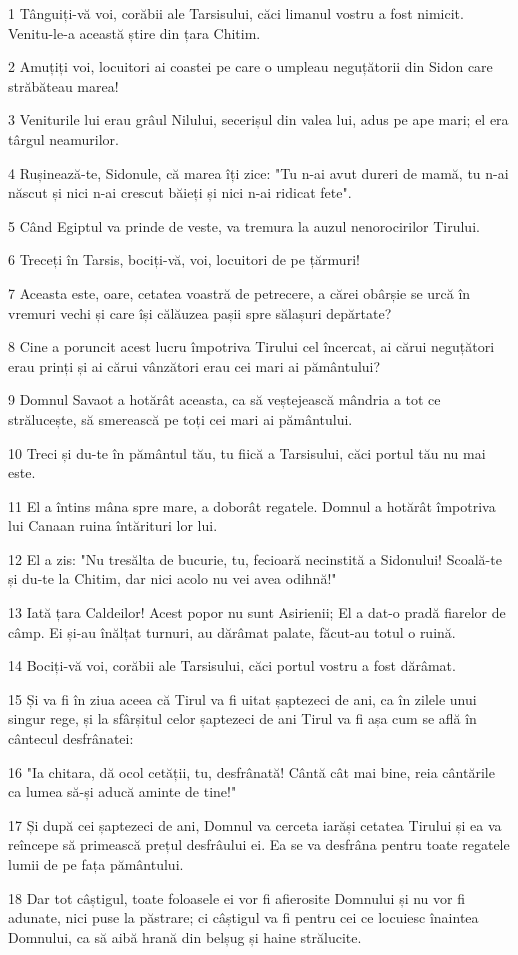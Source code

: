 \par 1 Tânguiți-vă voi, corăbii ale Tarsisului, căci limanul vostru a fost nimicit. Venitu-le-a această știre din țara Chitim.
\par 2 Amuțiți voi, locuitori ai coastei pe care o umpleau neguțătorii din Sidon care străbăteau marea!
\par 3 Veniturile lui erau grâul Nilului, secerișul din valea lui, adus pe ape mari; el era târgul neamurilor.
\par 4 Rușinează-te, Sidonule, că marea îți zice: "Tu n-ai avut dureri de mamă, tu n-ai născut și nici n-ai crescut băieți și nici n-ai ridicat fete".
\par 5 Când Egiptul va prinde de veste, va tremura la auzul nenorocirilor Tirului.
\par 6 Treceți în Tarsis, bociți-vă, voi, locuitori de pe țărmuri!
\par 7 Aceasta este, oare, cetatea voastră de petrecere, a cărei obârșie se urcă în vremuri vechi și care își călăuzea pașii spre sălașuri depărtate?
\par 8 Cine a poruncit acest lucru împotriva Tirului cel încercat, ai cărui neguțători erau prinți și ai cărui vânzători erau cei mari ai pământului?
\par 9 Domnul Savaot a hotărât aceasta, ca să veștejească mândria a tot ce strălucește, să smerească pe toți cei mari ai pământului.
\par 10 Treci și du-te în pământul tău, tu fiică a Tarsisului, căci portul tău nu mai este.
\par 11 El a întins mâna spre mare, a doborât regatele. Domnul a hotărât împotriva lui Canaan ruina întărituri lor lui.
\par 12 El a zis: "Nu tresălta de bucurie, tu, fecioară necinstită a Sidonului! Scoală-te și du-te la Chitim, dar nici acolo nu vei avea odihnă!"
\par 13 Iată țara Caldeilor! Acest popor nu sunt Asirienii; El a dat-o pradă fiarelor de câmp. Ei și-au înălțat turnuri, au dărâmat palate, făcut-au totul o ruină.
\par 14 Bociți-vă voi, corăbii ale Tarsisului, căci portul vostru a fost dărâmat.
\par 15 Și va fi în ziua aceea că Tirul va fi uitat șaptezeci de ani, ca în zilele unui singur rege, și la sfârșitul celor șaptezeci de ani Tirul va fi așa cum se află în cântecul desfrânatei:
\par 16 "Ia chitara, dă ocol cetății, tu, desfrânată! Cântă cât mai bine, reia cântările ca lumea să-și aducă aminte de tine!"
\par 17 Și după cei șaptezeci de ani, Domnul va cerceta iarăși cetatea Tirului și ea va reîncepe să primească prețul desfrâului ei. Ea se va desfrâna pentru toate regatele lumii de pe fața pământului.
\par 18 Dar tot câștigul, toate foloasele ei vor fi afierosite Domnului și nu vor fi adunate, nici puse la păstrare; ci câștigul va fi pentru cei ce locuiesc înaintea Domnului, ca să aibă hrană din belșug și haine strălucite.

